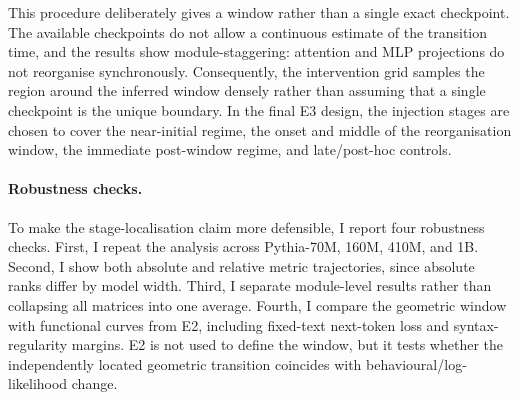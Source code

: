 This procedure deliberately gives a window rather than a single exact checkpoint. The available checkpoints do not allow a continuous estimate of the transition time, and the results show module-staggering: attention and MLP projections do not reorganise synchronously. Consequently, the intervention grid samples the region around the inferred window densely rather than assuming that a single checkpoint is the unique boundary. In the final E3 design, the injection stages are chosen to cover the near-initial regime, the onset and middle of the reorganisation window, the immediate post-window regime, and late/post-hoc controls.

\paragraph{Robustness checks.}
To make the stage-localisation claim more defensible, I report four robustness checks. First, I repeat the analysis across Pythia-70M, 160M, 410M, and 1B. Second, I show both absolute and relative metric trajectories, since absolute ranks differ by model width. Third, I separate module-level results rather than collapsing all matrices into one average. Fourth, I compare the geometric window with functional curves from E2, including fixed-text next-token loss and syntax-regularity margins. E2 is not used to define the window, but it tests whether the independently located geometric transition coincides with behavioural/log-likelihood change.
